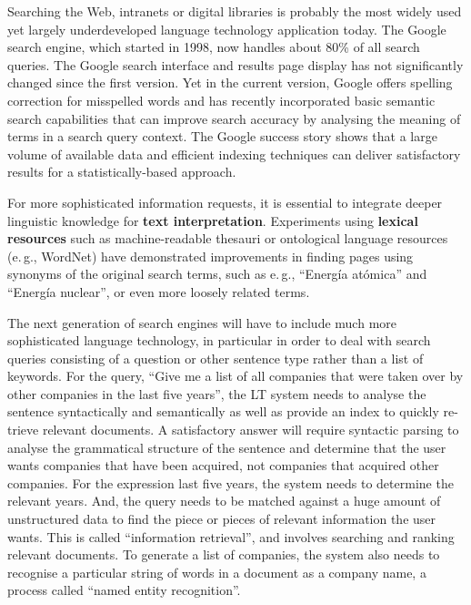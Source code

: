 \begin{multicols}{2}
Searching the Web, intranets or digital libraries is probably the most widely used yet largely underdeveloped language technology application today. The Google search engine, which started in 1998, now handles about 80\% of all search queries. The Google search interface and results page display has not significantly changed since the first version. Yet in the current version, Google offers spelling correction for misspelled words and has recently incorporated basic semantic search capabilities that can improve search accuracy by analysing the meaning of terms in a search query context.  The Google success story shows that a large volume of available data and efficient indexing techniques can deliver satisfactory results for a statistically-based approach.

For more sophisticated information requests, it is essential to integrate deeper linguistic knowledge for \textbf{text interpretation}. Experiments using \textbf{lexical resources} such as machine-readable thesauri or ontological language resources (e.\,g., WordNet) have demonstrated improvements in finding pages using synonyms of the original search terms, such as e.\,g., ``Energía atómica'' and ``Energía nuclear'', or even more loosely related terms. 


The next generation of search engines will have to include much more sophisticated language technology, in particular in order to deal with search queries consisting of a question or other sentence type rather than a list of keywords. For the query, ``Give me a list of all companies that were taken over by other companies in the last five years'', the LT system needs to analyse the sentence syntactically and semantically as well as provide an index to quickly re-trieve relevant documents. A satisfactory answer will require syntactic parsing to analyse the grammatical structure of the sentence and determine that the user wants companies that have been acquired, not companies that acquired other companies. For the expression last five years, the system needs to determine the relevant years. And, the query needs to be matched against a huge amount of unstructured data to find the piece or pieces of relevant information the user wants. This is called ``information retrieval'', and involves searching and ranking relevant documents. To generate a list of companies, the system also needs to recognise a particular string of words in a document as a company name, a process called ``named entity recognition''.


\end{multicols}
